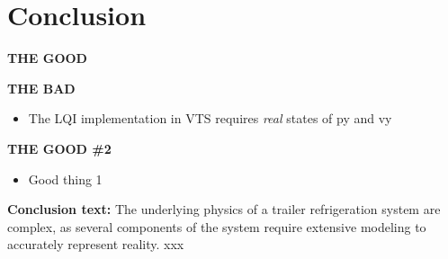 \section{Conclusion} \label{sec:concl}

\textbf{THE GOOD}


\noindent \textbf{THE BAD}

\begin{itemize}
	\item The LQI implementation in VTS requires \textit{real} states of py and vy
\end{itemize}

\noindent \textbf{THE GOOD \#2}

\begin{itemize}
	\item Good thing 1
\end{itemize}

\textbf{Conclusion text:}
 The underlying physics of a trailer refrigeration system are complex, as several components of the system require extensive modeling to accurately represent reality. xxx












